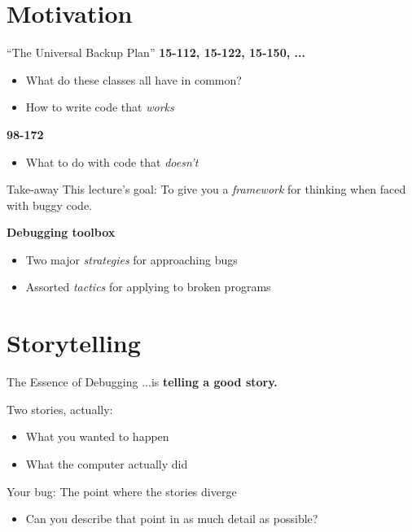 \documentclass[xcolor=dvipsnames]{beamer}
\begin{document}
\section{Motivation}

\begin{frame}{``The Universal Backup Plan''}
	\textbf{15-112, 15-122, 15-150, ...}
	\begin{itemize}
		\item What do these classes all have in common?
		\pause
		\item How to write code that {\em works}
	\end{itemize}
	\pause
	\linegap

	{\bf 98-172}
	\begin{itemize}
		\item What to do with code that {\em doesn't}
	\end{itemize}
\end{frame}

\begin{frame}{Take-away}
	This lecture's goal: To give you a {\em framework} for thinking when faced with buggy code.
	\linegap

	\textbf{Debugging toolbox}
	\begin{itemize}
		\item Two major {\em strategies} for approaching bugs
		\item Assorted {\em tactics} for applying to broken programs
	\end{itemize}
\end{frame}


\section{Storytelling}

\begin{frame}{The Essence of Debugging}
	...is {\bf telling a good story.}
	\pause
	\linegap

	Two stories, actually:
	\begin{itemize}
		\item What you wanted to happen
		\item What the computer actually did
	\end{itemize}
	\pause
	Your bug: The point where the stories diverge
	\begin{itemize}
		\item Can you describe that point in as much detail as possible?
	\end{itemize}
\end{frame}
\end{document}
